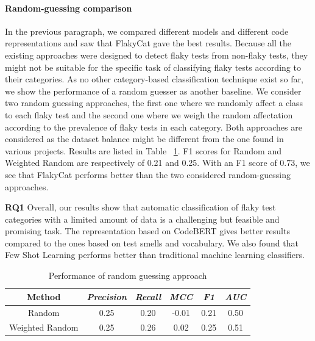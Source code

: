 \paragraph{Random-guessing comparison}
In the previous paragraph, we compared different models and different code representations and saw that FlakyCat gave the best results. Because all the existing approaches were designed to detect flaky tests from non-flaky tests, they might not be suitable for the specific task of classifying flaky tests according to their categories. As no other category-based classification technique exist so far, we show the performance of a random guesser as another baseline. We consider two random guessing approaches, the first one where we randomly affect a class to each flaky test and the second one where we weigh the random affectation according to the prevalence of flaky tests in each category. Both approaches are considered as the dataset balance might be different from the one found in various projects. Results are listed in Table ~\ref{scores-random}. F1 scores for Random and Weighted Random are respectively of 0.21 and 0.25. With an F1 score of 0.73, we see that FlakyCat performs better than the two considered random-guessing approaches. 

\begin{tcolorbox}

\textbf{RQ1} Overall, our results show that automatic classification of flaky test categories with a limited amount of data is a challenging but feasible and promising task. 
The representation based on CodeBERT gives better results compared to the ones based on test smells and vocabulary. We also found that Few Shot Learning performs better than traditional machine learning classifiers. 

\end{tcolorbox}

\begin{table}[ht]
\caption{Performance of random guessing approach}
\centering
\begin{tabular}{|c|c|c|c|c|c|}
\hline
\textbf{Method} & \textbf{\textit{Precision}}& \textbf{\textit{Recall}} & \textbf{\textit{ MCC}}& \textbf{\textit{F1}} & \textbf{\textit{AUC}} \\
\hline
Random & 0.25 & 0.20 & -0.01 & 0.21 & 0.50 \\
\hline
Weighted Random & 0.25 & 0.26 & 0.02 & 0.25 & 0.51 \\
\hline
\end{tabular}
\label{scores-random}
\end{table}

